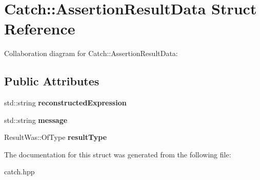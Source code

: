 \hypertarget{structCatch_1_1AssertionResultData}{}\section{Catch\+:\+:Assertion\+Result\+Data Struct Reference}
\label{structCatch_1_1AssertionResultData}


Collaboration diagram for Catch\+:\+:Assertion\+Result\+Data\+:
\subsection*{Public Attributes}
\begin{DoxyCompactItemize}
\item 
std\+::string {\bfseries reconstructed\+Expression}\hypertarget{structCatch_1_1AssertionResultData_a9e809d36fffbeb1c7d0cbe7382dd9595}{}\label{structCatch_1_1AssertionResultData_a9e809d36fffbeb1c7d0cbe7382dd9595}

\item 
std\+::string {\bfseries message}\hypertarget{structCatch_1_1AssertionResultData_ac34215803c4c4a88f795879f61c1f7b4}{}\label{structCatch_1_1AssertionResultData_ac34215803c4c4a88f795879f61c1f7b4}

\item 
Result\+Was\+::\+Of\+Type {\bfseries result\+Type}\hypertarget{structCatch_1_1AssertionResultData_a7ceab4a7ff722aec5587e3748caf66b7}{}\label{structCatch_1_1AssertionResultData_a7ceab4a7ff722aec5587e3748caf66b7}

\end{DoxyCompactItemize}


The documentation for this struct was generated from the following file\+:\begin{DoxyCompactItemize}
\item 
catch.\+hpp\end{DoxyCompactItemize}
